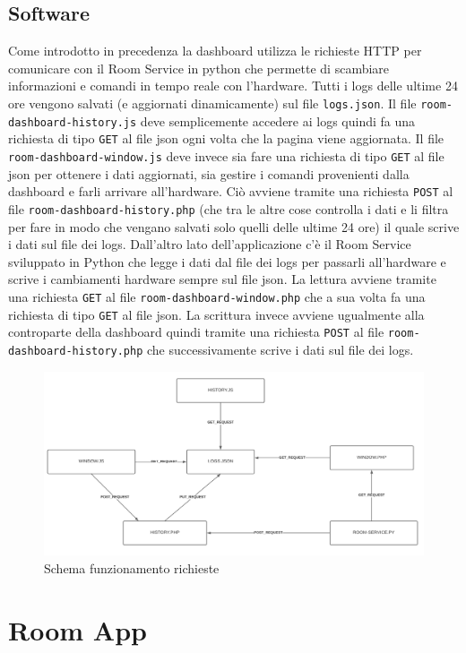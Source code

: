 \documentclass[12pt]{article}
\def\code#1{\texttt{#1}}
\begin{document}
\subsection{Software}
Come introdotto in precedenza la dashboard utilizza le richieste HTTP per comunicare con il Room Service in python che permette di scambiare informazioni e comandi in tempo reale con l'hardware.\newline
Tutti i logs delle ultime 24 ore vengono salvati (e aggiornati dinamicamente) sul file \code{logs.json}.\newline
Il file \code{room-dashboard-history.js} deve semplicemente accedere ai logs quindi fa una richiesta di tipo \code{GET} al file json ogni volta che la pagina viene aggiornata.\newline
Il file \code{room-dashboard-window.js} deve invece sia fare una richiesta di tipo \code{GET} al file json per ottenere i dati aggiornati, sia gestire i comandi provenienti dalla dashboard e farli arrivare all'hardware. Ciò avviene tramite una richiesta \code{POST} al file \code{room-dashboard-history.php} (che tra le altre cose controlla i dati e li filtra per fare in modo che vengano salvati solo quelli delle ultime 24 ore) il quale scrive i dati sul file dei logs.\newline
Dall'altro lato dell'applicazione c'è il Room Service sviluppato in Python che legge i dati dal file dei logs per passarli all'hardware e scrive i cambiamenti hardware sempre sul file json. La lettura avviene tramite una richiesta \code{GET} al file \code{room-dashboard-window.php} che a sua volta fa una richiesta di tipo \code{GET} al file json. La scrittura invece avviene ugualmente alla controparte della dashboard quindi tramite una richiesta \code{POST} al file \code{room-dashboard-history.php} che successivamente scrive i dati sul file dei logs.
\begin{figure}[H]
    \includegraphics[width=17cm]{dashboard-requests-schema.png}
    \centering
    \caption{Schema funzionamento richieste}
    \centering
\end{figure}

\newpage

\section{Room App}
\end{document}
